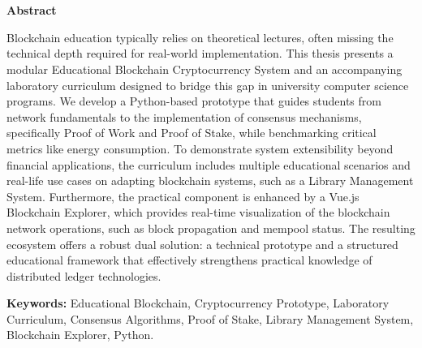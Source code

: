 \chapter*{}
\begin{center}
\label{abstract}
\textbf{Abstract}
\end{center}
Blockchain education typically relies on theoretical lectures, often missing the technical depth required for real-world implementation. This thesis presents a modular Educational Blockchain Cryptocurrency System and an accompanying laboratory curriculum designed to bridge this gap in university computer science programs. We develop a Python-based prototype that guides students from network fundamentals to the implementation of consensus mechanisms, specifically Proof of Work and Proof of Stake, while benchmarking critical metrics like energy consumption. To demonstrate system extensibility beyond financial applications, the curriculum includes multiple educational scenarios and real-life use cases on adapting blockchain systems, such as a Library Management System. Furthermore, the practical component is enhanced by a Vue.js Blockchain Explorer, which provides real-time visualization of the blockchain network operations, such as block propagation and mempool status. The resulting ecosystem offers a robust dual solution: a technical prototype and a structured educational framework that effectively strengthens practical knowledge of distributed ledger technologies.\vspace{0.3cm}

\textbf{Keywords:} Educational Blockchain, Cryptocurrency Prototype, Laboratory Curriculum, Consensus Algorithms, Proof of Stake, Library Management System, Blockchain Explorer, Python.
